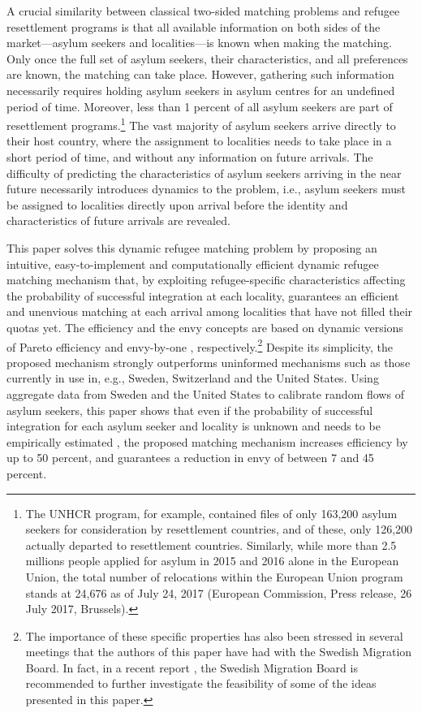 \documentclass[12pt,fleqn]{article}
\begin{document}
A crucial similarity between classical two-sided matching problems and refugee resettlement programs is that all available information on both sides of the market---asylum seekers and localities---is known when making the matching. Only once the full set of asylum seekers, their characteristics, and all preferences are known, the matching can take place. However, gathering such information necessarily requires holding asylum seekers in asylum centres for an undefined period of time. Moreover, less than 1 percent of all asylum seekers are part of resettlement programs.\footnote{The UNHCR program, for example, contained files of only 163,200 asylum seekers for consideration by resettlement countries, and of these, only 126,200 actually departed to resettlement countries. Similarly, while more than 2.5 millions people applied for asylum in 2015 and 2016 alone in the European Union, the total number of relocations within the European Union program stands at 24,676 as of July 24, 2017 (European Commission, Press release, 26 July 2017, Brussels).} The vast majority of asylum seekers arrive directly to their host country, where the assignment to localities needs to take place in a short period of time, and without any information on future arrivals. The difficulty of predicting the characteristics of asylum seekers arriving in the near future necessarily introduces dynamics to the problem, i.e., asylum seekers must be assigned to localities directly upon arrival before the identity and characteristics of future arrivals are revealed.

This paper solves this dynamic refugee matching problem by proposing an intuitive, easy-to-implement and computationally efficient dynamic refugee matching mechanism that, by exploiting refugee-specific characteristics affecting the probability of successful integration at each locality, guarantees an efficient and unenvious matching at each arrival among localities that have not filled their quotas yet. The efficiency and the envy concepts are based on dynamic versions of Pareto efficiency and envy-by-one \citep{bib:Budish}, respectively.\footnote{The importance of these specific properties has also been stressed in several meetings that the authors of this paper have had with the Swedish Migration Board. In fact, in a recent report \citep[Swedish Government,][]{SOU2018}, the Swedish Migration Board is recommended to further investigate the feasibility of some of the ideas presented in this paper.} Despite its simplicity, the proposed mechanism strongly outperforms uninformed mechanisms such as those currently in use in, e.g., Sweden, Switzerland and the United States. Using aggregate data from Sweden and the United States to calibrate random flows of asylum seekers, this paper shows that even if the probability of successful integration for each asylum seeker and locality is unknown and needs to be empirically estimated \citep[as in][]{bib:BansakEtAl}, the proposed matching mechanism increases efficiency by up to 50 percent, and guarantees a reduction in envy of between 7 and 45 percent.
\end{document}

